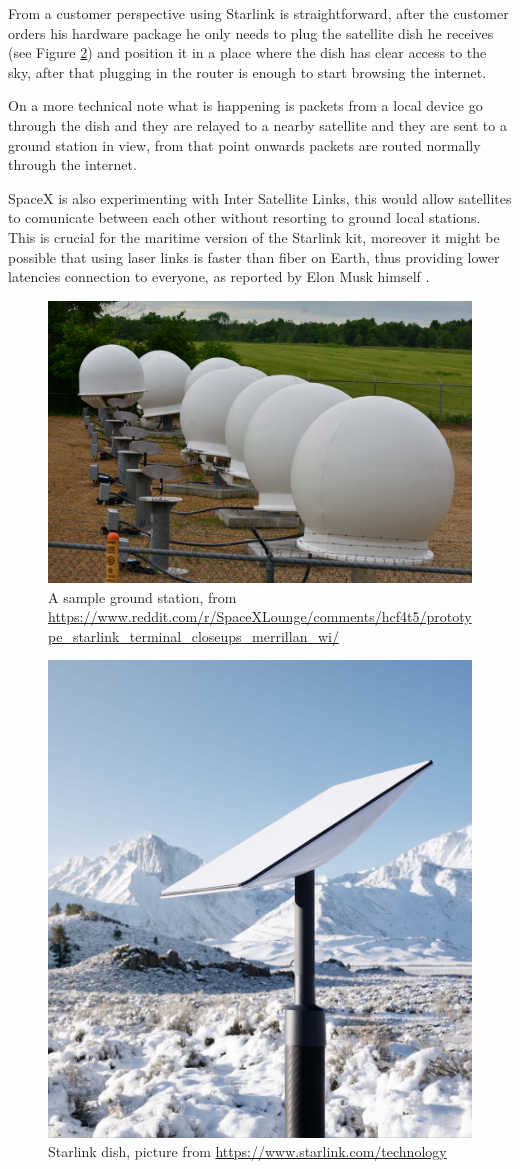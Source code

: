 \documentclass[IN,11pt,twoside,openright,bachelor,english]{tumthesis}
\begin{document}
From a customer perspective using Starlink is straightforward, after the customer orders his hardware package he only needs to plug the satellite dish he receives (see Figure \ref{fig:dish}) and position it in a place where the dish has clear access to the sky, after that plugging in the router is enough to start browsing the internet.

On a more technical note what is happening is packets from a local device go through the dish and they are relayed to a nearby satellite and they are sent to a ground station in view, from that point onwards packets are routed normally through the internet.

SpaceX is also experimenting with Inter Satellite Links, this would allow satellites to comunicate between each other without resorting to ground local stations. This is crucial for the maritime version of the Starlink kit, moreover it might be possible that using laser links is faster than fiber on Earth, thus providing lower latencies connection to everyone, as reported by Elon Musk himself \cite{tweet}.

\begin{figure}
	\centering
	\includegraphics[width=0.6\columnwidth]{img/ground-station.jpeg}
	\caption{A sample ground station, from \url{https://www.reddit.com/r/SpaceXLounge/comments/hcf4t5/prototype_starlink_terminal_closeups_merrillan_wi/}}
	\label{fig:gs}
\end{figure}

\begin{figure}
	\centering
	\includegraphics[width=0.6\columnwidth]{img/dish.jpeg}
	\caption{Starlink dish, picture from  \url{https://www.starlink.com/technology}}
	\label{fig:dish}
\end{figure}
\end{document}
